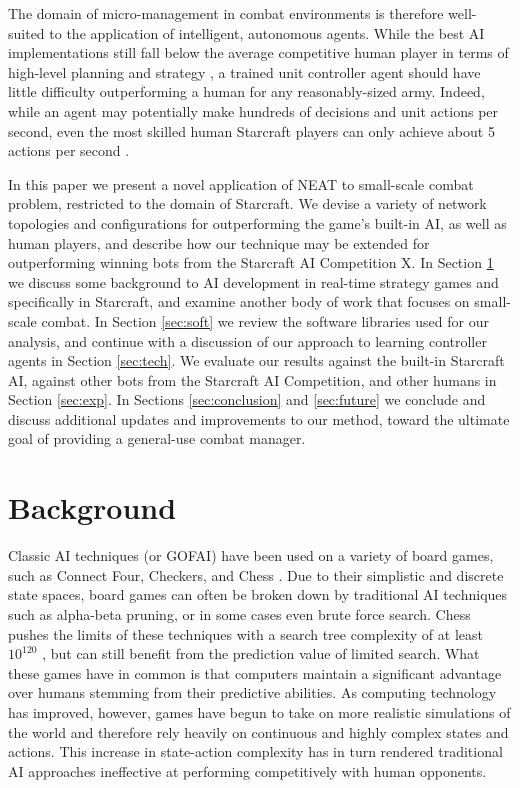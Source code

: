 \documentclass[a4paper]{article}
\newcommand{\fillin}[1]{X}
\begin{document}
The domain of micro-management in combat environments is therefore well-suited to the application of intelligent, autonomous agents. While the best AI implementations still fall below the average competitive human player in terms of high-level planning and strategy \cite{weber2011building}, a trained unit controller agent should have little difficulty outperforming a human for any reasonably-sized army. Indeed, while an agent may potentially make hundreds of decisions and unit actions per second, even the most skilled human Starcraft players can only achieve about 5 actions per second \cite{mccoy2008integrated}.

In this paper we present a novel application of NEAT to small-scale combat problem, restricted to the domain of Starcraft. We devise a variety of network topologies and configurations for outperforming the game's built-in AI, as well as human players, and describe how our technique may be extended for outperforming winning bots from the Starcraft AI Competition \fillin{AI competition citation}. In Section \ref{sec:back} we discuss some background to AI development in real-time strategy games and specifically in Starcraft, and examine another body of work that focuses on small-scale combat. In Section \ref{sec:soft} we review the software libraries used for our analysis, and continue with a discussion of our approach to learning controller agents in Section \ref{sec:tech}. We evaluate our results against the built-in Starcraft AI, against other bots from the Starcraft AI Competition, and other humans in Section \ref{sec:exp}. In Sections \ref{sec:conclusion} and \ref{sec:future} we conclude and discuss additional updates and improvements to our method, toward the ultimate goal of providing a general-use combat manager.

\section{Background}
\label{sec:back}

Classic AI techniques (or GOFAI) have been used on a variety of board games, such as Connect Four, Checkers, and Chess \cite{Allis94searchingfor}. Due to their simplistic and discrete state spaces, board games can often be broken down by traditional AI techniques such as alpha-beta pruning, or in some cases even brute force search. Chess pushes the limits of these techniques with a search tree complexity of at least $10^{120}$ \cite{Shannon:1988:PCP:61701.67002}, but can still benefit from the prediction value of limited search. What these games have in common is that computers maintain a significant advantage over humans stemming from their predictive abilities. As computing technology has improved, however, games have begun to take on more realistic simulations of the world and therefore rely heavily on continuous and highly complex states and actions. This increase in state-action complexity has in turn rendered traditional AI approaches ineffective at performing competitively with human opponents.
\end{document}
